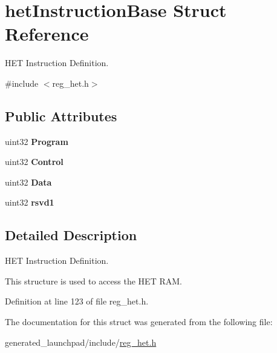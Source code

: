 \hypertarget{structhetInstructionBase}{}\section{het\+Instruction\+Base Struct Reference}
\label{structhetInstructionBase}


H\+ET Instruction Definition.  




{\ttfamily \#include $<$reg\+\_\+het.\+h$>$}

\subsection*{Public Attributes}
\begin{DoxyCompactItemize}
\item 
\mbox{\label{structhetInstructionBase_a487550fc487432014a2755499a6b6244}} 
uint32 {\bfseries Program}
\item 
\mbox{\label{structhetInstructionBase_ac195d982b47f62293d29c27c82da6f12}} 
uint32 {\bfseries Control}
\item 
\mbox{\label{structhetInstructionBase_afe69d195a42de7795c0eacd0a80531d5}} 
uint32 {\bfseries Data}
\item 
\mbox{\label{structhetInstructionBase_a05bab050935d41099ee0228bfd243c94}} 
uint32 {\bfseries rsvd1}
\end{DoxyCompactItemize}


\subsection{Detailed Description}
H\+ET Instruction Definition. 

This structure is used to access the H\+ET R\+AM. 

Definition at line 123 of file reg\+\_\+het.\+h.



The documentation for this struct was generated from the following file\+:\begin{DoxyCompactItemize}
\item 
generated\+\_\+launchpad/include/\mbox{\hyperlink{reg__het_8h}{reg\+\_\+het.\+h}}\end{DoxyCompactItemize}
